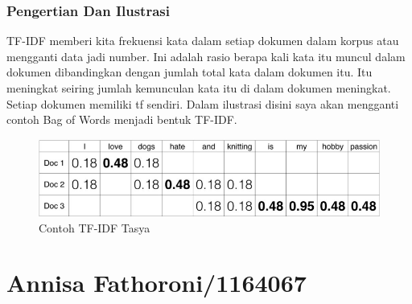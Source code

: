 \subsubsection{Pengertian Dan Ilustrasi}
TF-IDF  memberi kita frekuensi kata dalam setiap dokumen dalam korpus atau mengganti data jadi number. Ini adalah rasio berapa kali kata itu muncul dalam dokumen dibandingkan dengan jumlah total kata dalam dokumen itu. Itu meningkat seiring jumlah kemunculan kata itu di dalam dokumen meningkat. Setiap dokumen memiliki tf sendiri. Dalam ilustrasi disini saya akan mengganti contoh Bag of Words menjadi bentuk TF-IDF.
\begin{figure}[ht]
\centering
\includegraphics[scale=0.5]{figures/chapter4tasya5.png}
\caption{Contoh TF-IDF Tasya}
\label{Contoh}
\end{figure}

\section{Annisa Fathoroni/1164067}
